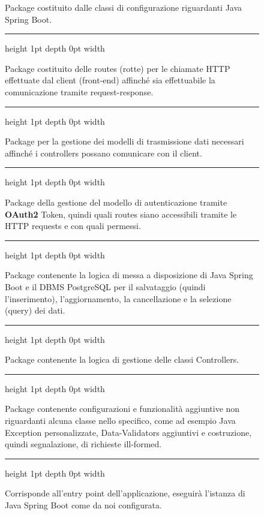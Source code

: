 \begin{figure}[h]
\begin{minipage}[t]{.25\textwidth}
		\end{minipage}
		\hfill
		\begin{minipage}[t]{0.70\textwidth}\vspace{0pt}
			\def\sepline{\begingroup\color{\ddchaptercolor}\vspace{6pt}\hrule height 1pt depth 0pt width \textwidth\relax\vspace{6pt}\endgroup}
			\begin{description}[leftmargin=!,labelwidth=\widthof{\bfseries Configuration},font=\color{ddchaptercolor!70!black}]
				\item[Configuration] Package costituito dalle classi di configurazione riguardanti Java Spring Boot.
					\sepline
				\item[Controllers] Package costituito delle routes (rotte) 
					per le chiamate HTTP effettuate dal client (front-end) affinché sia effettuabile la 
					comunicazione tramite request-response.
					\sepline
				\item[Entities] Package per la gestione dei modelli di trasmissione dati necessari affinché i controllers
					possano comunicare con il client.
					\sepline
				\item[Security] Package della gestione del modello di autenticazione tramite \textbf{OAuth2} Token, quindi quali routes
					siano accessibili tramite le HTTP requests e con quali permessi.
					\sepline
				\item[Repositories] Package contenente la logica di messa a disposizione di Java Spring Boot
					e il DBMS PostgreSQL per il salvataggio (quindi l'inserimento), l'aggiornamento, la cancellazione
					e la selezione (query) dei dati.
					\sepline
				\item[Service] Package contenente la logica di gestione delle classi Controllers.
					\sepline
				\item[Utilities] Package contenente configurazioni e funzionalità aggiuntive non riguardanti alcuna classe nello specifico, come ad esempio Java Exception personalizzate, Data-Validators aggiuntivi e costruzione, quindi segnalazione, di richieste ill-formed.
					\sepline
				\item[App.java] Corrisponde all'entry point dell'applicazione, eseguirà l'istanza di
					Java Spring Boot come da noi configurata.
			\end{description}
		\end{minipage}\hfill\null
	\end{figure}

